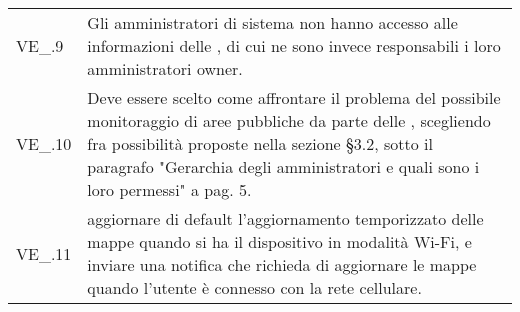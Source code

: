 {\begin{longtable}{ >{\centering}p{} >{}p{}}
	VE\_\Data.9 & Gli amministratori di sistema non hanno accesso alle informazioni delle \glo{organizzazioni}, di cui ne sono invece responsabili i loro amministratori owner. \\
	VE\_\Data.10 & Deve essere scelto come affrontare il problema del possibile monitoraggio di aree pubbliche da parte delle \glo{organizzazioni}, scegliendo fra possibilità proposte nella sezione §3.2, sotto il paragrafo "Gerarchia degli amministratori e quali sono i loro permessi" a pag. 5. \\
	VE\_\Data.11 & aggiornare di default l’aggiornamento temporizzato delle mappe quando si ha il dispositivo in modalità Wi-Fi, e inviare una notifica che richieda di aggiornare le mappe quando l’utente è connesso con la rete cellulare. \\
\end{longtable}
}


